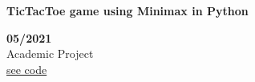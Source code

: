 \begin{minipage}{0.8\textwidth}
    \parbox{0.8\linewidth}{\textbf{TicTacToe game using Minimax in Python}} \hfill \textbf{05/2021}\\
    Academic Project\\
    \href{https://github.com/JavierOramas/TicTacToe_AI}{see code}\\
    \end{minipage} \hfill {}\\\\
    
